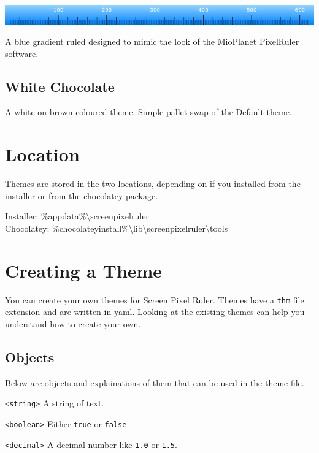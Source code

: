 \documentclass[
]{book}
\begin{document}
\includegraphics{images/theme-mioplanet.png}

A blue gradient ruled designed to mimic the look of the MioPlanet PixelRuler software.

\subsection{White Chocolate}\label{white-chocolate}

A white on brown coloured theme.
Simple pallet swap of the Default theme.

\section{Location}\label{location-1}

Themes are stored in the two locations, depending on if you installed from the installer or from the chocolatey package.

Installer: \%appdata\%\textbackslash screenpixelruler\\
Chocolatey: \%chocolateyinstall\%\textbackslash lib\textbackslash screenpixelruler\textbackslash tools

\section{Creating a Theme}\label{creating-a-theme}

You can create your own themes for Screen Pixel Ruler.
Themes have a \texttt{thm} file extension and are written in \href{https://yaml.org}{yaml}.
Looking at the existing themes can help you understand how to create your own.

\subsection{Objects}\label{objects}

Below are objects and explainations of them that can be used in the theme file.

\texttt{\textless{}string\textgreater{}} A string of text.

\texttt{\textless{}boolean\textgreater{}} Either \texttt{true} or \texttt{false}.

\texttt{\textless{}decimal\textgreater{}} A decimal number like \texttt{1.0} or \texttt{1.5}.
\end{document}
